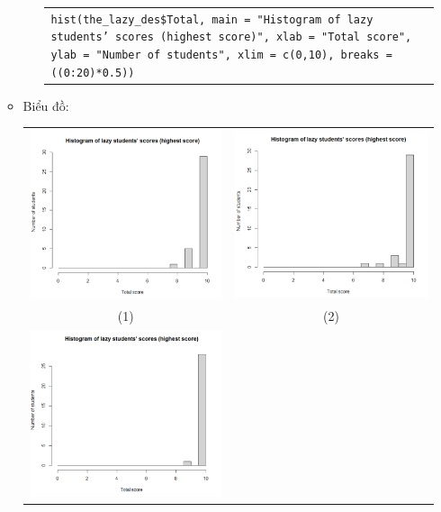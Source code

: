 \documentclass[a4paper]{article}
\theoremstyle{definition}
\begin{document}
\begin{enumerate}[a)]
\begin{itemize}
\begin{itemize}
            \begin{center}
                \begin{tabular}{p{13cm}}
                    \texttt{hist(the\_lazy\_des\$Total, main = "Histogram of lazy students' scores (highest score)", xlab = "Total score", ylab = "Number of students", xlim = c(0,10), breaks = ((0:20)*0.5))}
                \end{tabular}
            \end{center}
        \end{itemize}
        \item Biểu đồ:\\
        \begin{center}
            \begin{tabular}{c c}
                 \includegraphics[width = 6.9cm]{Images/img7-2-1.png} & \includegraphics[width = 6.9cm]{Images/img7-2-2.png} \\
                 (1) & (2) \\
                 \includegraphics[width = 6.9cm]{Images/img7-2-3.png} &

\end{tabular}
\end{center}
\end{itemize}
\end{enumerate}
\end{document}
